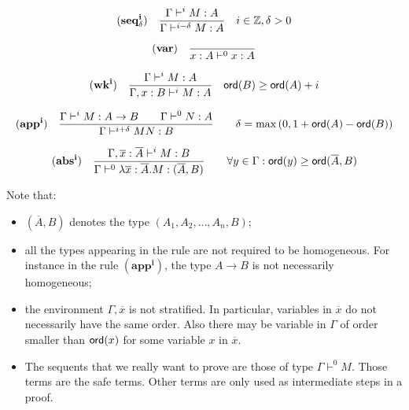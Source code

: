$$ \mathbf{(seq^i_\delta)} \quad \frac{\displaystyle \Gamma \vdash^{i} M : A}{\Gamma \vdash^{i-\delta} M : A} \quad i \in \mathbb{Z}, \delta > 0  $$

$$ \mathbf{(var)} \quad  \frac{\displaystyle }{x : A\vdash^{0} x : A} $$

$$ \mathbf{(wk^i)} \quad  \frac{\displaystyle \Gamma \vdash^i M : A}{\Gamma , x : B \vdash^i M : A} \quad {\sf ord}(B) \geq {\sf ord}(A) + i $$

$$ \mathbf{(app^i)} \quad  \frac{\displaystyle \Gamma \vdash^i M : A\rightarrow B
                                        \qquad \Gamma \vdash^{0} N : A}{\Gamma  \vdash^{i+\delta} M N : B}
                                    \qquad
                                   \delta = \max\left(0, 1 + {\sf ord}(A) - {\sf ord}(B)\right)$$

$$ \mathbf{(abs^i)} \quad  \frac{\displaystyle \Gamma, \overline{x} : \overline{A} \vdash^{i} M : B}{\Gamma  \vdash^{0} \lambda \overline{x} : \overline{A} . M : (\overline{A},B)} \qquad
                                   \forall y \in \Gamma : {\sf ord}(y) \geq {\sf ord}(\overline{A},B)$$


Note that:
\begin{itemize}
\item $(\overline{A},B)$ denotes the type $(A_1,A_2, \ldots, A_n, B)$;
\item all the types appearing in the rule are not required to be homogeneous. For instance in the rule $\mathbf{(app^i)}$, the type $A \rightarrow B$ is not necessarily
homogeneous;
\item the environment $\Gamma, \overline{x}$ is not stratified. In particular, variables in $\overline{x}$ do not necessarily have the same order. Also
there may be variable in $\Gamma$ of order smaller than ${\sf ord}(x)$
for some variable $x$ in $\overline{x}$.
\item The sequents that we really want to prove are those of type $\Gamma \vdash^0 M$. Those terms are the safe terms.
Other terms are only used as intermediate steps in a proof.
\end{itemize}


